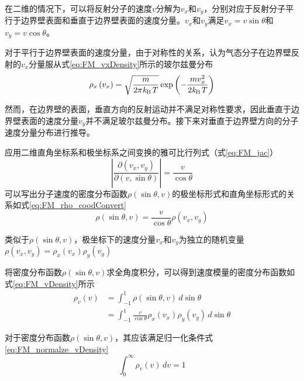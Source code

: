     在二维的情况下，可以将反射分子的速度$v$分解为$v_x$和$v_y$，分别对应于反射分子平行于边界壁表面和垂直于边界壁表面的速度分量。$v_x$和$v_y$满足$v_x=v\sin\theta$和$v_y=v\cos\theta$。

    对于平行于边界壁表面的速度分量，由于对称性的关系，认为气态分子在边界壁反射的$v_x$分量服从式\eqref{eq:FM_vxDensity}所示的玻尔兹曼分布\chinesecolon
    \begin{equation}
        \label{eq:FM_vxDensity}
        \rho_x\left(v_x\right)=\sqrt{\frac{m}{2\pi\it k_{\rm B} \it T}}\exp\left({-\frac{mv_x^2}{2\it k_{\rm B} \it T}}\right)
    \end{equation}

    然而，在边界壁的表面，垂直方向的反射运动并不满足对称性要求，因此垂直于边界壁表面的速度分量$v_y$并不满足玻尔兹曼分布。接下来对垂直于边界壁方向的分子速度分量分布进行推导。
    
    应用二维直角坐标系和极坐标系之间变换的雅可比行列式（式\eqref{eq:FM_jac}）\chinesecolon
    \begin{equation}
        \label{eq:FM_jac}
        \left\lvert \frac{\partial \left(v_x,v_y\right)}{\partial \left(v,\sin\theta\right)}\right\rvert=\frac{v}{\cos\theta}
    \end{equation}
    可以写出分子速度的密度分布函数$\rho\left(\sin\theta,v\right)$的极坐标形式和直角坐标形式的关系如式\eqref{eq:FM_rho_coodConvert}\chinesecolon
    \begin{equation}
        \label{eq:FM_rho_coodConvert}
        \rho\left(\sin\theta, v\right)=\frac{v}{\cos\theta}\rho\left(v_x,v_y\right)
    \end{equation}

    类似于$\rho\left(\sin\theta,v\right)$，极坐标下的速度分量$v_x$和$v_y$为独立的随机变量$\rho\left(v_x,v_y\right)=\rho_x\left(v_x\right)\rho_y\left(v_y\right)$

    将密度分布函数$\rho\left(\sin\theta,v\right)$求全角度积分，可以得到速度模量的密度分布函数如式\eqref{eq:FM_vDensity}所示
    \begin{equation}
        \label{eq:FM_vDensity}
        \begin{split}
            \rho_v\left(v\right)&=\int_{-1}^{1} \rho\left(\sin\theta,v\right) \,d\sin\theta \\[+1ex]
            &= \int_{-1}^{1} \frac{v}{\cos\theta} \rho_x\left(v_x\right)\rho_y\left(v_y\right) \,d\sin\theta
        \end{split}
    \end{equation}

    对于密度分布函数$\rho\left(\sin\theta,v\right)$，其应该满足归一化条件式\eqref{eq:FM_normalze_vDensity}\chinesecolon
    \begin{equation}
        \label{eq:FM_normalze_vDensity}
        \int_{0}^{\infty} \rho_v\left(v\right) \,dv = 1
    \end{equation}
    
